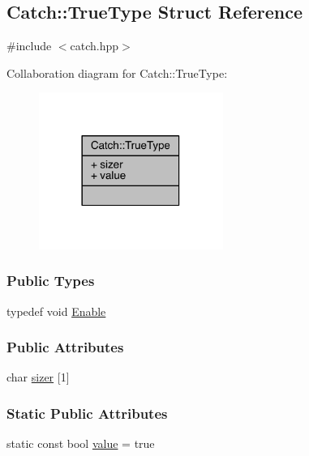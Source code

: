 \hypertarget{a00090}{}\subsection{Catch\+:\+:True\+Type Struct Reference}
\label{a00090}


{\ttfamily \#include $<$catch.\+hpp$>$}



Collaboration diagram for Catch\+:\+:True\+Type\+:\nopagebreak
\begin{figure}[H]
\begin{center}
\leavevmode
\includegraphics[width=170pt]{a00294}
\end{center}
\end{figure}
\subsubsection*{Public Types}
\begin{DoxyCompactItemize}
\item 
typedef void \hyperlink{a00090_a1c370b2ef39036c053357b868ef94a97}{Enable}
\end{DoxyCompactItemize}
\subsubsection*{Public Attributes}
\begin{DoxyCompactItemize}
\item 
char \hyperlink{a00090_a8a7ed3be2e763d614e7d1f0cd18219d1}{sizer} \mbox{[}1\mbox{]}
\end{DoxyCompactItemize}
\subsubsection*{Static Public Attributes}
\begin{DoxyCompactItemize}
\item 
static const bool \hyperlink{a00090_ac7b4114d6c6d3d4ff8d2df67f243d2be}{value} = true
\end{DoxyCompactItemize}



